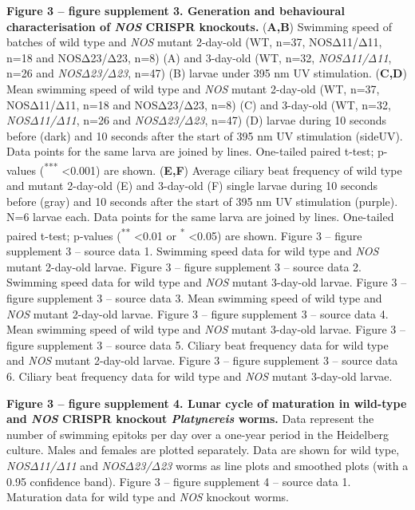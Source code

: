 \documentclass[
  11pt,
  letterpaper,
  DIV=11,
  numbers=noendperiod]{scrartcl}
\begin{document}
\textbf{Figure 3 -- figure supplement 3. Generation and behavioural
characterisation of \emph{NOS} CRISPR knockouts.} (\textbf{A,B})
Swimming speed of batches of wild type and \emph{NOS} mutant 2-day-old
(WT, n=37, NOSΔ11/Δ11, n=18 and NOSΔ23/Δ23, n=8) (A) and 3-day-old (WT,
n=32, \emph{NOSΔ11/Δ11}, n=26 and \emph{NOSΔ23/Δ23}, n=47) (B) larvae
under 395 nm UV stimulation. (\textbf{C,D}) Mean swimming speed of wild
type and \emph{NOS} mutant 2-day-old (WT, n=37, NOSΔ11/Δ11, n=18 and
NOSΔ23/Δ23, n=8) (C) and 3-day-old (WT, n=32, \emph{NOSΔ11/Δ11}, n=26
and \emph{NOSΔ23/Δ23}, n=47) (D) larvae during 10 seconds before (dark)
and 10 seconds after the start of 395 nm UV stimulation (sideUV). Data
points for the same larva are joined by lines. One-tailed paired t-test;
p-values (\textsuperscript{***} \textless0.001) are shown.
(\textbf{E,F}) Average ciliary beat frequency of wild type and mutant
2-day-old (E) and 3-day-old (F) single larvae during 10 seconds before
(gray) and 10 seconds after the start of 395 nm UV stimulation (purple).
N=6 larvae each. Data points for the same larva are joined by lines.
One-tailed paired t-test; p-values (\textsuperscript{**} \textless0.01
or \textsuperscript{*} \textless0.05) are shown. Figure 3 -- figure
supplement 3 -- source data 1. Swimming speed data for wild type and
\emph{NOS} mutant 2-day-old larvae. Figure 3 -- figure supplement 3 --
source data 2. Swimming speed data for wild type and \emph{NOS} mutant
3-day-old larvae. Figure 3 -- figure supplement 3 -- source data 3. Mean
swimming speed of wild type and \emph{NOS} mutant 2-day-old larvae.
Figure 3 -- figure supplement 3 -- source data 4. Mean swimming speed of
wild type and \emph{NOS} mutant 3-day-old larvae. Figure 3 -- figure
supplement 3 -- source data 5. Ciliary beat frequency data for wild type
and \emph{NOS} mutant 2-day-old larvae. Figure 3 -- figure supplement 3
-- source data 6. Ciliary beat frequency data for wild type and
\emph{NOS} mutant 3-day-old larvae.

\textbf{Figure 3 -- figure supplement 4. Lunar cycle of maturation in
wild-type and \emph{NOS} CRISPR knockout \emph{Platynereis} worms.} Data
represent the number of swimming epitoks per day over a one-year period
in the Heidelberg culture. Males and females are plotted separately.
Data are shown for wild type, \emph{NOSΔ11/Δ11} and \emph{NOSΔ23/Δ23}
worms as line plots and smoothed plots (with a 0.95 confidence band).
Figure 3 -- figure supplement 4 -- source data 1. Maturation data for
wild type and \emph{NOS} knockout worms.
\end{document}

